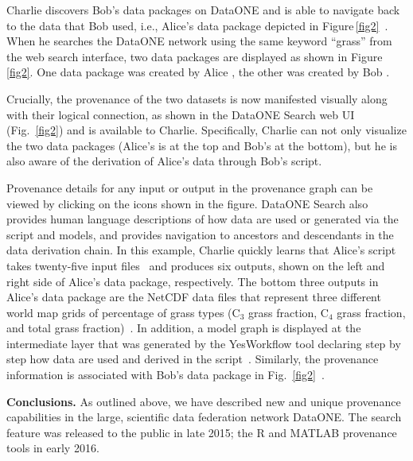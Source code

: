 \documentclass[a4paper]{llncs}
\newcommand{\mypara}[1]{\vspace{4pt}\noindent\textbf{#1}}
\newcommand{\code}[1]{\ensuremath{\mathsf{#1}}}
\newcommand{\Figref}[1]{Figure\,\ref{#1}}
\begin{document}
Charlie discovers Bob's data packages on DataONE and is able to navigate back to the data that Bob used, i.e., Alice's data package depicted in \Figref{fig2}~\cite{Katz,data-trajectories}. When he searches the DataONE network using the same keyword ``grass'' from the web search interface, two data packages are displayed as shown in \Figref{fig2}. One data package was created by Alice \cite{yaxing}, the other was created by Bob \cite{christopher}.

Crucially, the provenance of the two datasets is now manifested visually along with their logical connection, as shown in the DataONE Search web UI \cite{dataone-demo} (Fig.~\ref{fig2}) and is available to Charlie. Specifically, Charlie can not only visualize the two data packages (Alice's is at the top and Bob's at the bottom), but he is also aware of the derivation of Alice's data through Bob's script.

Provenance details for any input or output in the provenance graph can be viewed by clicking on the icons shown in the figure. %
DataONE Search also provides human language descriptions of how data are used or generated via the script and models, and provides navigation to ancestors and descendants in the data derivation chain.
%
In this example, Charlie quickly learns that Alice's script %
takes twenty-five input files~\cite{MsTMIP-model-driver-data-set} and produces six outputs, shown on the left and right side of Alice's data package, respectively. The bottom three outputs in Alice's data package are the NetCDF data files that represent three different world map grids of percentage of grass types (C$_3$ grass fraction, C$_4$ grass fraction, and total grass fraction)~\cite{MsTMIP-model-driver-data-set}. In addition, a model graph is displayed at the intermediate layer that was generated by the YesWorkflow tool declaring step by step how data are used and derived in the script~\cite{yesworkflow}. Similarly, the provenance information is associated with Bob's data package in Fig.~\ref{fig2}~\cite{christopher,dataone-prov-tech-report-2016,MsTMIP-model-output-data-set}.



\mypara{Conclusions.}  As outlined above, we have described new and unique provenance capabilities in the large, scientific data federation network DataONE. The search feature was released to the public in late 2015; the R and MATLAB provenance tools in early 2016.



\end{document}
